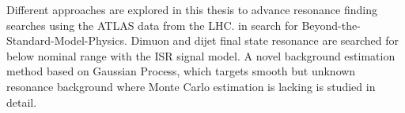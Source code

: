 %
%
%
%
%
%
Different approaches are explored in this thesis to advance resonance finding searches using the ATLAS data from the LHC.
in search for Beyond-the-Standard-Model-Physics. Dimuon and dijet final state resonance are searched for below nominal range with the ISR signal model. A novel background estimation method based on Gaussian Process, which targets smooth but unknown resonance background where Monte Carlo estimation is lacking is studied in detail. 
